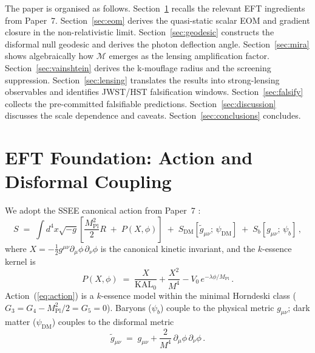 \documentclass[12pt,a4paper]{article}
\newcommand{\KAL}{\mathrm{KAL}_0}
\newcommand{\MIRA}{\mathcal{M}}
\newcommand{\Mpl}{M_{\mathrm{Pl}}}
\newcommand{\half}{\tfrac{1}{2}}
\begin{document}
The paper is organised as follows.
Section~\ref{sec:eft} recalls the relevant EFT ingredients from Paper~7.
Section~\ref{sec:eom} derives the quasi-static scalar EOM and gradient
closure in the non-relativistic limit.
Section~\ref{sec:geodesic} constructs the disformal null geodesic and
derives the photon deflection angle.
Section~\ref{sec:mira} shows algebraically how $\MIRA$ emerges as the
lensing amplification factor.
Section~\ref{sec:vainshtein} derives the k-mouflage radius and the
screening suppression.
Section~\ref{sec:lensing} translates the results into strong-lensing
observables and identifies JWST/HST falsification windows.
Section~\ref{sec:falsify} collects the pre-committed falsifiable
predictions.
Section~\ref{sec:discussion} discusses the scale dependence
and caveats.
Section~\ref{sec:conclusions} concludes.

\section{EFT Foundation: Action and Disformal Coupling}
\label{sec:eft}

We adopt the SSEE canonical action from Paper~7 \citep{ssee_paper7}:
\begin{equation}
  S \;=\; \int d^4x\sqrt{-g}\left[
      \frac{\Mpl^2}{2}R
      \;+\; P(X,\phi)
  \right]
  \;+\; S_{\mathrm{DM}}\!\left[\tilde{g}_{\mu\nu};\,\psi_{\mathrm{DM}}\right]
  \;+\; S_b[g_{\mu\nu};\,\psi_b]\,,
  \label{eq:action}
\end{equation}
where $X = -\half g^{\mu\nu}\partial_\mu\phi\,\partial_\nu\phi$ is the
canonical kinetic invariant, and the $k$-essence kernel is
\begin{equation}
  P(X,\phi) \;=\; \frac{X}{\KAL} + \frac{X^2}{M^4} - V_0\,e^{-\lambda\phi/\Mpl}\,.
  \label{eq:Pkernel}
\end{equation}
Action~(\ref{eq:action}) is a $k$-essence model within the minimal
Horndeski class \citep{horndeski1974,Crisostomi2018} ($G_3=G_4-\Mpl^2/2=G_5=0$).
Baryons ($\psi_b$) couple to the physical metric $g_{\mu\nu}$; dark matter
($\psi_{\mathrm{DM}}$) couples to the disformal metric \citep{Bekenstein1993,Zumalacárregui2014}
\begin{equation}
  \tilde{g}_{\mu\nu} \;=\; g_{\mu\nu} + \frac{2}{M^4}\,\partial_\mu\phi\,\partial_\nu\phi\,.
  \label{eq:disformal}
\end{equation}
\end{document}
